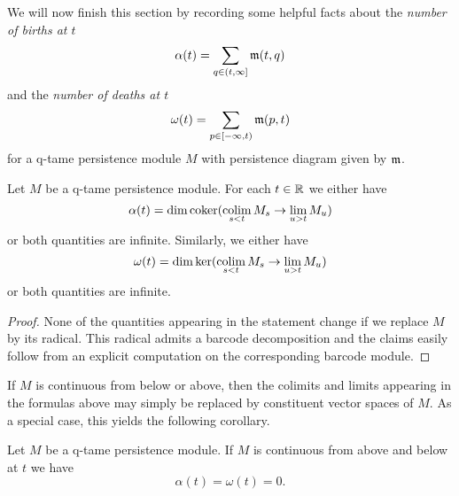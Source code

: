 We will now finish this section by recording some helpful facts about the \emph{number of births at $t$}
\[
	\alpha(t) = \sum_{q \in (t, \infty]} \mathfrak{m}(t,q)
\]
and the \emph{number of deaths at $t$}
\[
	\omega(t) = \sum_{p \in [-\infty, t)} \mathfrak{m}(p,t)
\]
for a q-tame persistence module $M$ with persistence diagram given by $\mathfrak{m}$.


\begin{lem}
\label{lem:birth_death_formulas}
	Let $M$ be a q-tame persistence module.
	For each $t \in \mathbb{R}$ we either have
	\[
		\alpha(t) = \dim \operatorname{coker} (\operatorname*{colim}_{s < t} M_{s} \to \lim_{u > t} M_{u})
	\]
	or both quantities are infinite.
	Similarly, we either have
	\[
		\omega(t) = \dim \ker (\operatorname*{colim}_{s < t} M_{s} \to \lim_{u > t} M_{u})
	\]
	or both quantities are infinite.
\end{lem}
\begin{proof}
	None of the quantities appearing in the statement change if we replace $M$ by its radical.
	This radical admits a barcode decomposition and the claims easily follow from an explicit computation on the corresponding barcode module.
\end{proof}

If $M$ is continuous from below or above, then the colimits and limits appearing in the formulas above may simply be replaced by constituent vector spaces of $M$.
As a special case, this yields the following corollary.

\begin{cor}
\label{cor:regular_value_no_endpoint}
	Let $M$ be a q-tame persistence module.
	If $M$ is continuous from above and below at $t$ we have
	\[
		\alpha(t) = \omega(t) = 0.
	\]
\end{cor}



